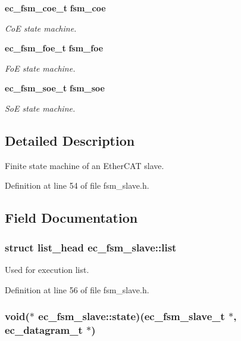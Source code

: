 \begin{DoxyCompactItemize}
{\bf ec\-\_\-fsm\-\_\-coe\-\_\-t} {\bf fsm\-\_\-coe}
\begin{DoxyCompactList}\small\item\em \-Co\-E state machine. \end{DoxyCompactList}\item 
{\bf ec\-\_\-fsm\-\_\-foe\-\_\-t} {\bf fsm\-\_\-foe}
\begin{DoxyCompactList}\small\item\em \-Fo\-E state machine. \end{DoxyCompactList}\item 
{\bf ec\-\_\-fsm\-\_\-soe\-\_\-t} {\bf fsm\-\_\-soe}
\begin{DoxyCompactList}\small\item\em \-So\-E state machine. \end{DoxyCompactList}\end{DoxyCompactItemize}


\subsection{\-Detailed \-Description}
\-Finite state machine of an \-Ether\-C\-A\-T slave. 

\-Definition at line 54 of file fsm\-\_\-slave.\-h.



\subsection{\-Field \-Documentation}
\subsubsection[{list}]{\setlength{\rightskip}{0pt plus 5cm}struct list\-\_\-head {\bf ec\-\_\-fsm\-\_\-slave\-::list}}\label{structec__fsm__slave_ae393c328b5fe12f06f19f05fe140a643}


\-Used for execution list. 



\-Definition at line 56 of file fsm\-\_\-slave.\-h.

\subsubsection[{state}]{\setlength{\rightskip}{0pt plus 5cm}void($\ast$ {\bf ec\-\_\-fsm\-\_\-slave\-::state})({\bf ec\-\_\-fsm\-\_\-slave\-\_\-t} $\ast$, {\bf ec\-\_\-datagram\-\_\-t} $\ast$)}\label{structec__fsm__slave_a4e1432b74dca46446094400fff326c6f}


